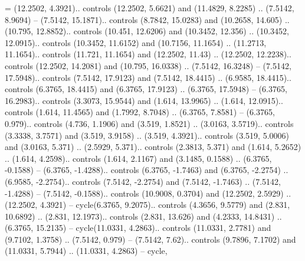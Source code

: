 \ctpdollar = {(12.2502, 4.3921).. controls (12.2502, 5.6621) and (11.4829, 8.2285) .. (7.5142, 8.9694) -- (7.5142, 15.1871).. controls (8.7842, 15.0283) and (10.2658, 14.605) .. (10.795, 12.8852).. controls (10.451, 12.6206) and (10.3452, 12.356) .. (10.3452, 12.0915).. controls (10.3452, 11.6152) and (10.7156, 11.1654) .. (11.2713, 11.1654).. controls (11.721, 11.1654) and (12.2502, 11.43) .. (12.2502, 12.2238).. controls (12.2502, 14.2081) and (10.795, 16.0338) .. (7.5142, 16.3248) -- (7.5142, 17.5948).. controls (7.5142, 17.9123) and (7.5142, 18.4415) .. (6.9585, 18.4415).. controls (6.3765, 18.4415) and (6.3765, 17.9123) .. (6.3765, 17.5948) -- (6.3765, 16.2983).. controls (3.3073, 15.9544) and (1.614, 13.9965) .. (1.614, 12.0915).. controls (1.614, 11.4565) and (1.7992, 8.7048) .. (6.3765, 7.8581) -- (6.3765, 0.979).. controls (4.736, 1.1906) and (3.519, 1.8521) .. (3.0163, 3.5719).. controls (3.3338, 3.7571) and (3.519, 3.9158) .. (3.519, 4.3921).. controls (3.519, 5.0006) and (3.0163, 5.371) .. (2.5929, 5.371).. controls (2.3813, 5.371) and (1.614, 5.2652) .. (1.614, 4.2598).. controls (1.614, 2.1167) and (3.1485, 0.1588) .. (6.3765, -0.1588) -- (6.3765, -1.4288).. controls (6.3765, -1.7463) and (6.3765, -2.2754) .. (6.9585, -2.2754).. controls (7.5142, -2.2754) and (7.5142, -1.7463) .. (7.5142, -1.4288) -- (7.5142, -0.1588).. controls (10.9008, 0.3704) and (12.2502, 2.5929) .. (12.2502, 4.3921) -- cycle(6.3765, 9.2075).. controls (4.3656, 9.5779) and (2.831, 10.6892) .. (2.831, 12.1973).. controls (2.831, 13.626) and (4.2333, 14.8431) .. (6.3765, 15.2135) -- cycle(11.0331, 4.2863).. controls (11.0331, 2.7781) and (9.7102, 1.3758) .. (7.5142, 0.979) -- (7.5142, 7.62).. controls (9.7896, 7.1702) and (11.0331, 5.7944) .. (11.0331, 4.2863) -- cycle},

